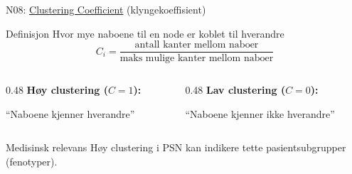 \documentclass[aspectratio=169, 10pt]{beamer}
\begin{document}
\begin{frame}{N08: \href{https://en.wikipedia.org/wiki/Clustering_coefficient}{Clustering Coefficient} (klyngekoeffisient)}
    
    \begin{block}{Definisjon}
        Hvor mye naboene til en node er koblet til hverandre
        \[
        C_i = \frac{\text{antall kanter mellom naboer}}{\text{maks mulige kanter mellom naboer}}
        \]
    \end{block}
    
    \vspace{2mm}
    
    \begin{columns}
        \begin{column}{0.48\textwidth}
            \textbf{Høy clustering ($C = 1$):}
            \begin{center}
            \end{center}
            ``Naboene kjenner hverandre''
        \end{column}
        
        \begin{column}{0.48\textwidth}
            \textbf{Lav clustering ($C = 0$):}
            \begin{center}
            \end{center}
            ``Naboene kjenner ikke hverandre''
        \end{column}
    \end{columns}
    
    \vspace{1mm}
    
    \begin{block}{\footnotesize Medisinsk relevans}
        \footnotesize Høy clustering i PSN kan indikere tette pasientsubgrupper (fenotyper).
    \end{block}
    
\end{frame}
\end{document}
